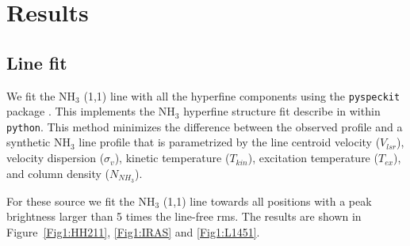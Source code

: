 \section{Results}

\subsection{Line fit}
We fit the NH$_3$ (1,1) line with all the hyperfine components using the \verb+pyspeckit+ package \cite{2011ascl.soft09001G}. 
This implements the NH$_3$ hyperfine structure fit describe in \cite{Rosolowsky_2008} within \verb+python+.
This method minimizes the difference between the observed profile and a synthetic NH$_3$ line profile 
that is parametrized by the line centroid velocity ($V_{lsr}$), velocity dispersion ($\sigma_v$), 
kinetic temperature ($T_{kin}$), excitation temperature ($T_{ex}$), and column density ($N_{NH_3}$).

For these source we fit the NH$_3$ (1,1) line towards all positions with a peak brightness larger than
5 times the line-free rms. 
The results are shown in Figure~\ref{Fig1:HH211}, \ref{Fig1:IRAS} and \ref{Fig1:L1451}.